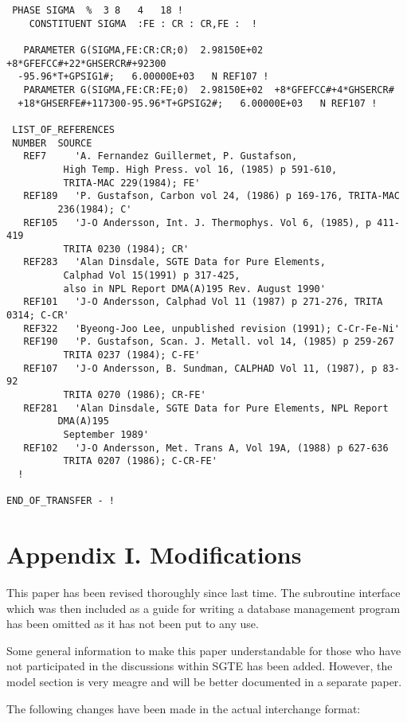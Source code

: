 \documentclass[12pt]{article}
\begin{document}
\begin{verbatim}
 PHASE SIGMA  %  3 8   4   18 !
    CONSTITUENT SIGMA  :FE : CR : CR,FE :  !

   PARAMETER G(SIGMA,FE:CR:CR;0)  2.98150E+02  +8*GFEFCC#+22*GHSERCR#+92300
  -95.96*T+GPSIG1#;   6.00000E+03   N REF107 !
   PARAMETER G(SIGMA,FE:CR:FE;0)  2.98150E+02  +8*GFEFCC#+4*GHSERCR#
  +18*GHSERFE#+117300-95.96*T+GPSIG2#;   6.00000E+03   N REF107 !

 LIST_OF_REFERENCES
 NUMBER  SOURCE
   REF7     'A. Fernandez Guillermet, P. Gustafson, 
          High Temp. High Press. vol 16, (1985) p 591-610, 
          TRITA-MAC 229(1984); FE'
   REF189   'P. Gustafson, Carbon vol 24, (1986) p 169-176, TRITA-MAC 
         236(1984); C'
   REF105   'J-O Andersson, Int. J. Thermophys. Vol 6, (1985), p 411-419 
          TRITA 0230 (1984); CR'
   REF283   'Alan Dinsdale, SGTE Data for Pure Elements, 
          Calphad Vol 15(1991) p 317-425, 
          also in NPL Report DMA(A)195 Rev. August 1990'
   REF101   'J-O Andersson, Calphad Vol 11 (1987) p 271-276, TRITA 0314; C-CR'
   REF322   'Byeong-Joo Lee, unpublished revision (1991); C-Cr-Fe-Ni'
   REF190   'P. Gustafson, Scan. J. Metall. vol 14, (1985) p 259-267 
          TRITA 0237 (1984); C-FE'
   REF107   'J-O Andersson, B. Sundman, CALPHAD Vol 11, (1987), p 83-92 
          TRITA 0270 (1986); CR-FE'
   REF281   'Alan Dinsdale, SGTE Data for Pure Elements, NPL Report 
         DMA(A)195 
          September 1989'
   REF102   'J-O Andersson, Met. Trans A, Vol 19A, (1988) p 627-636 
          TRITA 0207 (1986); C-CR-FE'
  ! 

END_OF_TRANSFER - !
\end{verbatim}

\newpage

\section{Appendix I. Modifications}

This paper has been revised thoroughly since last time. The subroutine
interface which was then included as a guide for writing a database
management program has been omitted as it has not been put to any use.

Some general information to make this paper understandable for those
who have not participated in the discussions within SGTE has been added.
However, the model section is very meagre and will be better documented
in a separate paper.

The following changes have been made in the actual interchange format:
\end{document}
